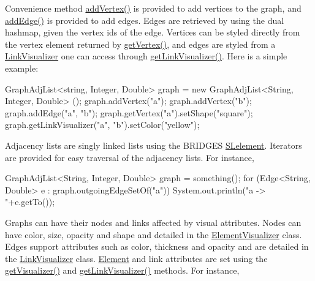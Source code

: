 Convenience method \hyperlink{classbridges_1_1base_1_1_graph_adj_list_aca59a3c40af4ae82716ebbfa1751f267}{add\+Vertex()} is provided to add vertices to the graph, and \hyperlink{classbridges_1_1base_1_1_graph_adj_list_a43041976184920e1db1dbe3ad696c6cd}{add\+Edge()} is provided to add edges. Edges are retrieved by using the dual hashmap, given the vertex ids of the edge. Vertices can be styled directly from the vertex element returned by \hyperlink{classbridges_1_1base_1_1_graph_adj_list_aa19cd300a85b05352bdf58720310a112}{get\+Vertex()}, and edges are styled from a \hyperlink{classbridges_1_1base_1_1_link_visualizer}{Link\+Visualizer} one can access through \hyperlink{classbridges_1_1base_1_1_graph_adj_list_af93888dbd2a768a2401619ad5dc95560}{get\+Link\+Visualizer()}. Here is a simple example\+:


\begin{DoxyCode}
GraphAdjList<string, Integer, Double> graph = \textcolor{keyword}{new} GraphAdjList<String, Integer, Double> ();
   graph.addVertex(\textcolor{stringliteral}{"a"});
   graph.addVertex(\textcolor{stringliteral}{"b"});
   graph.addEdge(\textcolor{stringliteral}{"a"}, \textcolor{stringliteral}{"b"});
   graph.getVertex(\textcolor{stringliteral}{"a"}).setShape(\textcolor{stringliteral}{"square"});
   graph.getLinkVisualizer(\textcolor{stringliteral}{"a"}, \textcolor{stringliteral}{"b"}).setColor(\textcolor{stringliteral}{"yellow"});
\end{DoxyCode}


Adjacency lists are singly linked lists using the B\+R\+I\+D\+G\+ES \hyperlink{classbridges_1_1base_1_1_s_lelement}{S\+Lelement}. Iterators are provided for easy traversal of the adjacency lists. For instance,


\begin{DoxyCode}
GraphAdjList<String, Integer, Double> graph = something();
\textcolor{keywordflow}{for} (Edge<String, Double> e : graph.outgoingEdgeSetOf(\textcolor{stringliteral}{"a"}))
  System.out.println(\textcolor{stringliteral}{"a -> "}+e.getTo());
\end{DoxyCode}


Graphs can have their nodes and links affected by visual attributes. Nodes can have color, size, opacity and shape and detailed in the \hyperlink{classbridges_1_1base_1_1_element_visualizer}{Element\+Visualizer} class. Edges support attributes such as color, thickness and opacity and are detailed in the \hyperlink{classbridges_1_1base_1_1_link_visualizer}{Link\+Visualizer} class. \hyperlink{classbridges_1_1base_1_1_element}{Element} and link attributes are set using the \hyperlink{classbridges_1_1base_1_1_graph_adj_list_aafb45833cd5c13b6ce9bdece3fefde6a}{get\+Visualizer()} and \hyperlink{classbridges_1_1base_1_1_graph_adj_list_af93888dbd2a768a2401619ad5dc95560}{get\+Link\+Visualizer()} methods. For instance,


